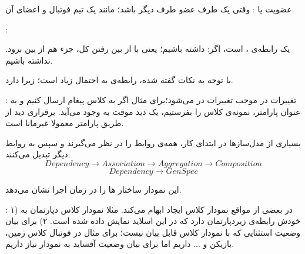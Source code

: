  عضویت یا : وقتی یک طرف عضو طرف دیگر باشد؛ مانند یک تیم فوتبال و اعضای آن.


: 

یک رابطه‌ی ،  است، اگر:
  داشته باشیم؛ یعنی با از بین رفتن کل، جزء هم از بین برود.
  نداشته باشیم.

 با توجه به نکات گفته شده، رابطه‌ی  به احتمال زیاد  است؛ زیرا  دارد.

: تغییرات در  موجب تغییرات در  می‌شود؛برای مثال اگر به کلاس  پیغام ارسال کنیم و به عنوان پارامتر، نمونه‌ی کلاس  را بفرستیم، یک دید موقت به وجود می‌آید. برقراری دید از طریق پارامتر معمولا غیرمانا است.

بسیاری از مدل‌سازها در ابتدای کار، همه‌ی روابط را  در نظر می‌گیرند و سپس به روابط دیگر تبدیل می‌کنند:
\begin{equation*}
	Dependency \rightarrow Association \rightarrow Aggregation \rightarrow Composition
\end{equation*}
\begin{equation*}
	Dependency \rightarrow GenSpec
\end{equation*}

این نمودار ساختار ها را در زمان اجرا نشان می‌دهد. 

: ۱) در بعضی از مواقع نمودار کلاس ایجاد ابهام می‌کند. مثلا نمودار کلاس دپارتمان به خودش رابطه‌ی زیردپارتمان دارد که در این اسلاید نمایش داده شده است. ۲) برای بیان وضعیت استثنایی که با نمودار کلاس قابل بیان نیست؛ برای مثال در فوتبال کلاس زمین، بازیکن و ... داریم اما برای بیان وضعیت آفساید به نمودار  نیاز داریم.

